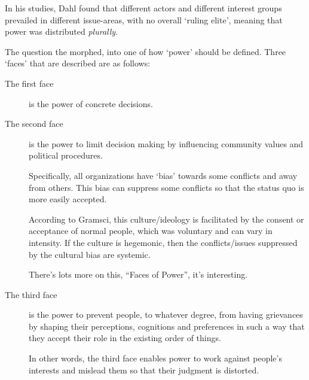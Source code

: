 In his studies, Dahl found that different actors and different
interest groups prevailed in different issue-areas, with no overall
`ruling elite', meaning that power was distributed \textit{plurally}.

The question the morphed, into one of how `power' should be
defined. Three `faces' that are described are as follows:


\begin{description}
  \item[The first face] is the power of concrete decisions.
  \item[The second face] is the power to limit decision making by
    influencing community values and political procedures.

    Specifically, all organizations have `bias' towards some
    conflicts and away from others. This bias can suppress some
    conflicts so that the status quo is more easily accepted.

    According to Gramsci, this culture/ideology is facilitated by the
    consent or acceptance of normal people, which was voluntary and
    can vary in intensity. If the culture is hegemonic, then the
    conflicts/issues suppressed by the cultural bias are systemic.

    There's lots more on this, ``Faces of Power'', it's interesting.
  \item[The third face] is the power to prevent people, to whatever
    degree, from having grievances by shaping their perceptions,
    cognitions and preferences in such a way that they accept their
    role in the existing order of things.

    In other words, the third face enables power to work against
    people's interests and mislead them so that their judgment is
    distorted.
\end{description}


